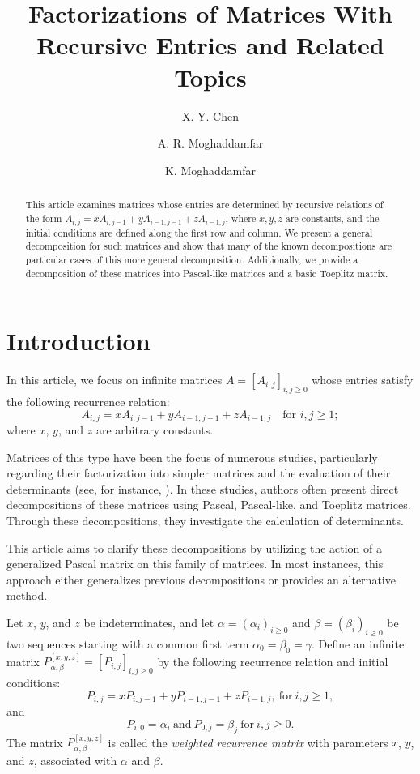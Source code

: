 \documentclass{amsart}
\title[Factorizations of Matrices With Recursive Entries and Related Topics]{Factorizations of Matrices With Recursive Entries and Related Topics}
\author[X. Y. Chen]{X. Y. Chen}
\author[A. R. Moghaddamfar]{A. R. Moghaddamfar}
\author[K. Moghaddamfar]{K. Moghaddamfar}
\begin{document}
\maketitle
\begin{abstract}
This article examines matrices whose entries are determined by recursive relations of the form $A_{i, j} = x A_{i, j-1} + y A_{i-1, j-1} + z A_{i-1, j}$, where $x, y, z$ are constants, and the initial conditions are defined along the first row and column. We present a general decomposition for such matrices and show that many of the known decompositions are particular cases of this more general decomposition. Additionally, we provide a decomposition of these matrices into Pascal-like matrices and a basic Toeplitz matrix.
\end{abstract}


\section{Introduction}
In this article, we focus on infinite matrices $A = [A_{i, j}]_{i, j \geqslant 0}$ whose entries satisfy the following recurrence relation:
\[A_{i, j} = x A_{i, j-1} + yA_{i-1,j-1} + zA_{i-1,j} \quad \text{for } i, j \geq 1;\]
where $x$, $y$, and $z$ are arbitrary constants.


Matrices of this type have been the focus of numerous studies, particularly regarding their factorization into simpler matrices and the evaluation of their determinants (see, for instance, \cite{K2, M, T}). In these studies, authors often present direct decompositions of these matrices using Pascal, Pascal-like, and Toeplitz matrices. Through these decompositions, they investigate the calculation of determinants.

This article aims to clarify these decompositions by utilizing the action of a generalized Pascal matrix on this family of matrices. In most instances, this approach either generalizes previous decompositions or provides an alternative method.

Let $x$, $y$, and $z$ be indeterminates, and let $\alpha=(\alpha_i)_{i\geq 0}$ and $\beta=(\beta_i)_{i\geq 0}$ be two sequences starting with a common first term $\alpha_0=\beta_0=\gamma$.  
Define an infinite matrix $P_{\alpha, \beta}^{[x, y, z]} = [P_{i, j}]_{i, j \geq 0}$ by the following recurrence relation and initial conditions:
\[P_{i, j} = xP_{i, j-1}+yP_{i-1, j-1}+zP_{i-1, j}, \  \text{for} \ i, j\geq 1,\]
and 
$$P_{i, 0}= \alpha_i  \  \text{and} \  P_{0, j}=\beta_j \ \text{for}   \ i, j\geq 0.$$
The matrix $P_{\alpha, \beta}^{[x, y, z]}$ is called the {\em weighted  recurrence matrix} with parameters $x$, $y$, and $z$, associated with $\alpha$ and $\beta$. 
\end{document}
